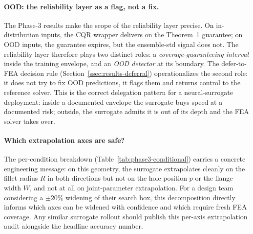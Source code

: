 \documentclass[11pt]{article}
\begin{document}
\paragraph{OOD: the reliability layer as a flag, not a fix.}
The Phase-3 results make the scope of the reliability layer precise. On
in-distribution inputs, the CQR wrapper delivers on the Theorem~1
guarantee; on OOD inputs, the guarantee expires, but the ensemble-std
signal does not. The reliability layer therefore plays two distinct roles:
a \emph{coverage-guaranteeing interval} inside the training envelope, and
an \emph{OOD detector} at its boundary. The defer-to-FEA decision rule
(Section~\ref{ssec:results-deferral}) operationalizes the second role: it
does not try to fix OOD predictions, it flags them and returns control to
the reference solver. This is the correct delegation pattern for a
neural-surrogate deployment: inside a documented envelope the surrogate
buys speed at a documented risk; outside, the surrogate admits it is out
of its depth and the FEA solver takes over.

\paragraph{Which extrapolation axes are safe?}
The per-condition breakdown (Table~\ref{tab:phase3-conditional}) carries
a concrete engineering message: on this geometry, the surrogate
extrapolates cleanly on the fillet radius $R$ in both directions but not
on the hole position $p$ or the flange width $W$, and not at all on
joint-parameter extrapolation. For a design team considering a $\pm 20\%$
widening of their search box, this decomposition directly informs which
axes can be widened with confidence and which require fresh FEA coverage.
Any similar surrogate rollout should publish this per-axis extrapolation
audit alongside the headline accuracy number.
\end{document}
